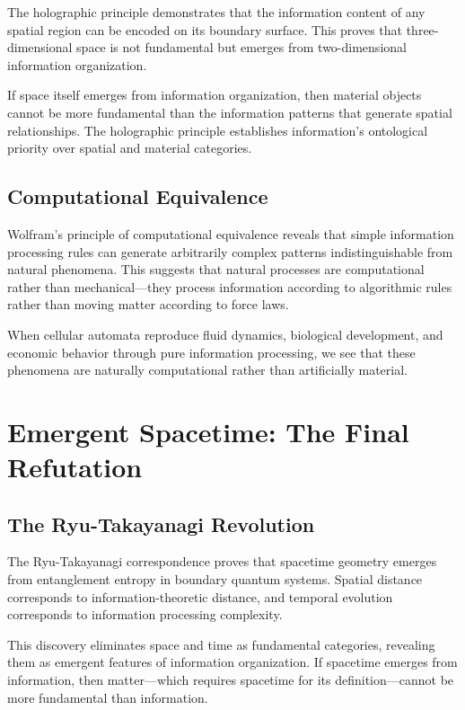 \documentclass[12pt]{article}
\begin{document}
The holographic principle demonstrates that the information content of any spatial region can be encoded on its boundary surface. This proves that three-dimensional space is not fundamental but emerges from two-dimensional information organization.

If space itself emerges from information organization, then material objects cannot be more fundamental than the information patterns that generate spatial relationships. The holographic principle establishes information's ontological priority over spatial and material categories.

\subsection{Computational Equivalence}

Wolfram's principle of computational equivalence reveals that simple information processing rules can generate arbitrarily complex patterns indistinguishable from natural phenomena. This suggests that natural processes are computational rather than mechanical—they process information according to algorithmic rules rather than moving matter according to force laws.

When cellular automata reproduce fluid dynamics, biological development, and economic behavior through pure information processing, we see that these phenomena are naturally computational rather than artificially material.

\section{Emergent Spacetime: The Final Refutation}

\subsection{The Ryu-Takayanagi Revolution}

The Ryu-Takayanagi correspondence proves that spacetime geometry emerges from entanglement entropy in boundary quantum systems. Spatial distance corresponds to information-theoretic distance, and temporal evolution corresponds to information processing complexity.

This discovery eliminates space and time as fundamental categories, revealing them as emergent features of information organization. If spacetime emerges from information, then matter—which requires spacetime for its definition—cannot be more fundamental than information.
\end{document}
